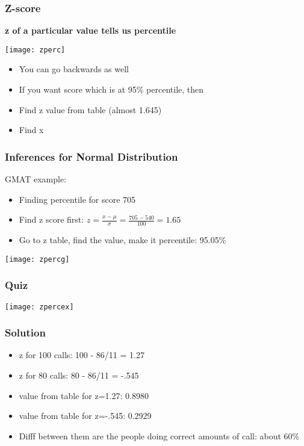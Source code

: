 \begin{frame}[fragile]\frametitle{Z-score}
{\bf z of a particular value tells us percentile}
\begin{center}
\texttt{[image: zperc]}
\end{center}
\begin{itemize}
\item You can go backwards as well
\item If you want score which is at 95\% percentile, then
\item Find z value from table (almost 1.645)
\item Find x
\end{itemize}
\end{frame}



\begin{frame}[fragile]\frametitle{Inferences for Normal Distribution}
GMAT example:

\begin{itemize}
\item Finding percentile for score 705
\item Find z score first: $z = \frac{x - \mu}{\sigma} = \frac{705-540}{100} = 1.65$
\item Go to z table, find the value, make it percentile: 95.05\%
\end{itemize}
\begin{center}
\texttt{[image: zpercg]}
\end{center}
\end{frame}


\begin{frame}[fragile]\frametitle{Quiz}
\begin{center}
\texttt{[image: zpercex]}
\end{center}
\end{frame}

\begin{frame}[fragile]\frametitle{Solution}
\begin{itemize}
\item z for 100 calls: 100 - 86/11 = 1.27
\item z for 80 calls: 80 - 86/11 = -.545
\item value from table for z=1.27: 0.8980
\item value from table for z=-.545: 0.2929
\item Difff between them are the people doing correct amounts of call: about 60\%
\end{itemize}
\end{frame}

